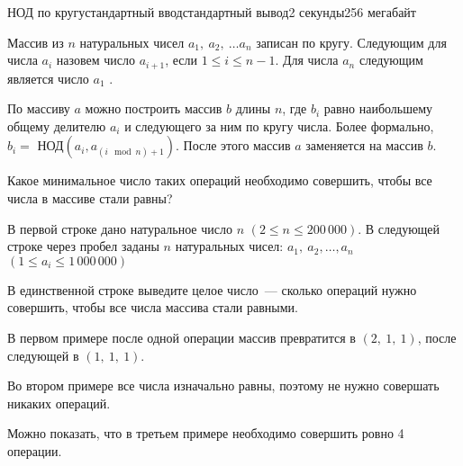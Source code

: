 \begin{problem}{НОД по кругу}{стандартный ввод}{стандартный вывод}{2 секунды}{256 мегабайт}

Массив из $n$ натуральных чисел $a_1,\ a_2,\ \ldots a_n$ записан по кругу. Следующим для числа $a_i$ назовем число $a_{i + 1}$, если $1 \leq i \leq n - 1$. Для числа $a_n$ следующим является число $a_1$ .

По массиву $a$ можно построить массив $b$ длины $n$, где $b_i$ равно наибольшему общему делителю $a_i$ и следующего за ним по кругу числа. Более формально, $b_i =$ НОД$(a_i, a_{(i \mod n) + 1})$. После этого массив $a$ заменяется на массив $b$.

Какое минимальное число таких операций необходимо совершить, чтобы все числа в массиве стали равны?

\InputFile
В первой строке дано натуральное число $n$ $(2 \leqslant  n \leqslant 200\,000)$. В следующей строке через пробел заданы $n$ натуральных чисел: $a_1,\ a_2,\ldots, a_n$ $(1 \leqslant a_i \leq 1\,000\,000)$

\OutputFile
В единственной строке выведите целое число~--- сколько операций нужно совершить, чтобы все числа массива стали равными.

\Examples

\begin{example}
%
%
%
\end{example}

\Note
В первом примере после одной операции массив превратится в $(2,\ 1,\ 1)$, после следующей в $(1,\ 1,\ 1)$.

Во втором примере все числа изначально равны, поэтому не нужно совершать никаких операций.

Можно показать, что в третьем примере необходимо совершить ровно 4 операции.

\end{problem}

